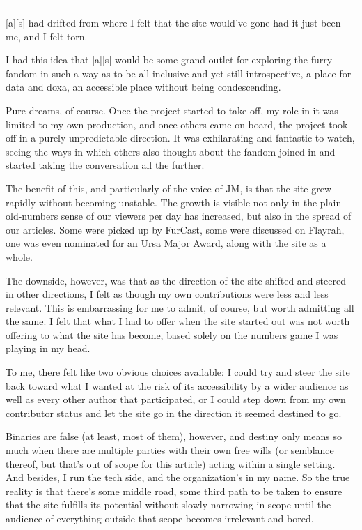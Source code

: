 \begin{center}\rule{0.5\linewidth}{\linethickness}\end{center}

{[}a{]}{[}s{]} had drifted from where I felt that the site would've gone
had it just been me, and I felt torn.

I had this idea that {[}a{]}{[}s{]} would be some grand outlet for
exploring the furry fandom in such a way as to be all inclusive and yet
still introspective, a place for data and doxa, an accessible place
without being condescending.

Pure dreams, of course. Once the project started to take off, my role in
it was limited to my own production, and once others came on board, the
project took off in a purely unpredictable direction. It was
exhilarating and fantastic to watch, seeing the ways in which others
also thought about the fandom joined in and started taking the
conversation all the further.

The benefit of this, and particularly of the voice of JM, is that the
site grew rapidly without becoming unstable. The growth is visible not
only in the plain-old-numbers sense of our viewers per day has
increased, but also in the spread of our articles. Some were picked up
by FurCast, some were discussed on Flayrah, one was even nominated for
an Ursa Major Award, along with the site as a whole.

The downside, however, was that as the direction of the site shifted and
steered in other directions, I felt as though my own contributions were
less and less relevant. This is embarrassing for me to admit, of course,
but worth admitting all the same. I felt that what I had to offer when
the site started out was not worth offering to what the site has become,
based solely on the numbers game I was playing in my head.

To me, there felt like two obvious choices available: I could try and
steer the site back toward what I wanted at the risk of its
accessibility by a wider audience as well as every other author that
participated, or I could step down from my own contributor status and
let the site go in the direction it seemed destined to go.

Binaries are false (at least, most of them), however, and destiny only
means so much when there are multiple parties with their own free wills
(or semblance thereof, but that's out of scope for this article) acting
within a single setting. And besides, I run the tech side, and the
organization's in my name. So the true reality is that there's some
middle road, some third path to be taken to ensure that the site
fulfills its potential without slowly narrowing in scope until the
audience of everything outside that scope becomes irrelevant and bored.

